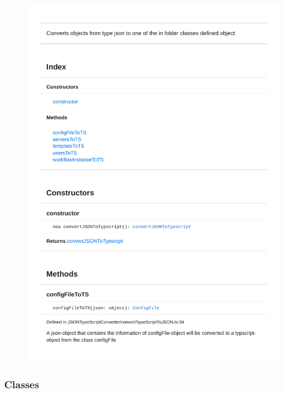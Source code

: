 \begin{figure}[H]
\centerline{\includegraphics[width=\textwidth]{FrontendDocsAsPDF/JSONTypeSriptConverter/convertTypeScriptToJSON.pdf}}
\end{figure}

\subsubsection{Classes}

